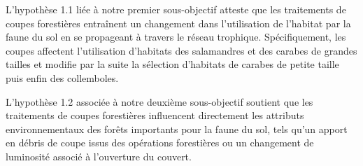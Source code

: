 
L'hypothèse 1.1 liée à notre premier sous-objectif atteste que les traitements de coupes forestières entraînent un changement dans l'utilisation de l'habitat par la faune du sol en se propageant à travers le réseau trophique. 
Spécifiquement, les coupes affectent l'utilisation d'habitats des salamandres et des carabes de grandes tailles et modifie par la suite la sélection d'habitats de carabes de petite taille puis enfin des collemboles. 

L'hypothèse 1.2 associée à notre deuxième sous-objectif soutient que les traitements de coupes forestières influencent directement les attributs environnementaux des forêts importants pour la faune du sol, 
tels qu'un apport en débris de coupe issus des opérations forestières ou un changement de luminosité associé à l'ouverture du couvert.


\cleardoublepage



